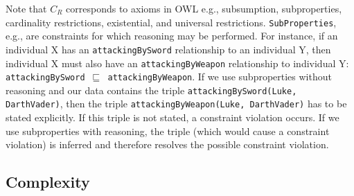 \documentclass{llncs}
\newcommand{\ms}[1]{\texttt{#1}}
\newcommand{\tb}[1]{\todo[size=\small, color=green!40]{\textbf{Thomas:} #1}}
\newcommand{\er}[1]{\todo[size=\small, color=red!40]{\textbf{Erman:} #1}}
\begin{document}
Note that $C_R$ corresponds to axioms in OWL  e.g., subsumption, subproperties, cardinality restrictions, existential, and universal restrictions.
\ms{SubProperties}, e.g., are constraints for which reasoning may be performed.
For instance, if an individual X has an \ms{attackingBySword} relationship to an individual Y, 
then individual X must also have an \ms{attackingByWeapon} relationship to individual Y: \ms{attackingBySword $\sqsubseteq$ attackingByWeapon}.
If we use subproperties without reasoning and our data contains the triple \ms{attackingBySword(Luke, DarthVader)},
then the triple \ms{attackingByWeapon(Luke, DarthVader)} has to be stated explicitly.
If this triple is not stated, a constraint violation occurs.
If we use subproperties with reasoning, the triple (which would cause a constraint violation) is inferred and therefore resolves the possible constraint violation.

\subsection{Complexity}
\label{sec:constraints-complexity}
\end{document}
